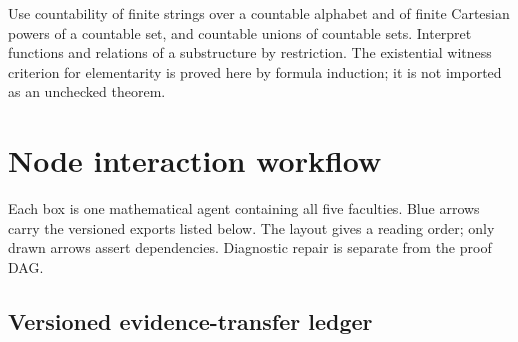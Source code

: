 \documentclass[preprint,12pt,aps,pra,showkeys,amsmath,amssymb,superscriptaddress,floatfix]{revtex4-2}
\theoremstyle{definition}
\theoremstyle{remark}
\begin{document}
Use countability of finite strings over a countable alphabet and of
finite Cartesian powers of a countable set, and countable unions of
countable sets. Interpret functions and relations of a substructure by
restriction. The existential witness criterion for elementarity is
proved here by formula induction; it is not imported as an unchecked
theorem.

\clearpage\section{Node interaction workflow}

\begin{center}\end{center}

Each box is one mathematical agent containing all five faculties. Blue
arrows carry the versioned exports listed below. The layout gives a
reading order; only drawn arrows assert dependencies. Diagnostic repair
is separate from the proof DAG.

\subsection{Versioned evidence-transfer ledger}
\end{document}
